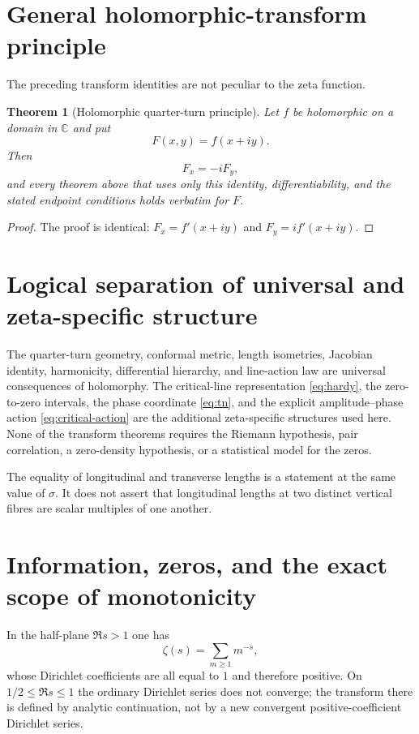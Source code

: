 \documentclass[11pt]{amsart}
\numberwithin{equation}{section}
\newtheorem{theorem}{Theorem}[section]
\newcommand{\C}{\mathbb C}
\begin{document}
\section{General holomorphic-transform principle}

The preceding transform identities are not peculiar to the zeta function.

\begin{theorem}[Holomorphic quarter-turn principle]
Let $f$ be holomorphic on a domain in $\C$ and put
\[
F(x,y)=f(x+iy).
\]
Then
\[
F_x=-iF_y,
\]
and every theorem above that uses only this identity, differentiability, and the stated endpoint conditions holds verbatim for $F$.
\end{theorem}

\begin{proof}
The proof is identical: $F_x=f'(x+iy)$ and $F_y=if'(x+iy)$.
\end{proof}

\section{Logical separation of universal and zeta-specific structure}

The quarter-turn geometry, conformal metric, length isometries, Jacobian identity, harmonicity, differential hierarchy, and line-action law are universal consequences of holomorphy.  The critical-line representation \eqref{eq:hardy}, the zero-to-zero intervals, the phase coordinate \eqref{eq:tn}, and the explicit amplitude--phase action \eqref{eq:critical-action} are the additional zeta-specific structures used here.  None of the transform theorems requires the Riemann hypothesis, pair correlation, a zero-density hypothesis, or a statistical model for the zeros.

The equality of longitudinal and transverse lengths is a statement at the same value of $\sigma$.  It does not assert that longitudinal lengths at two distinct vertical fibres are scalar multiples of one another.

\section{Information, zeros, and the exact scope of monotonicity}

In the half-plane $\Re s>1$ one has
\[
\zeta(s)=\sum_{m\ge1}m^{-s},
\]
whose Dirichlet coefficients are all equal to $1$ and therefore positive.
On $1/2\le\Re s\le1$ the ordinary Dirichlet series does not converge;
the transform there is defined by analytic continuation, not by a new
convergent positive-coefficient Dirichlet series.
\end{document}
